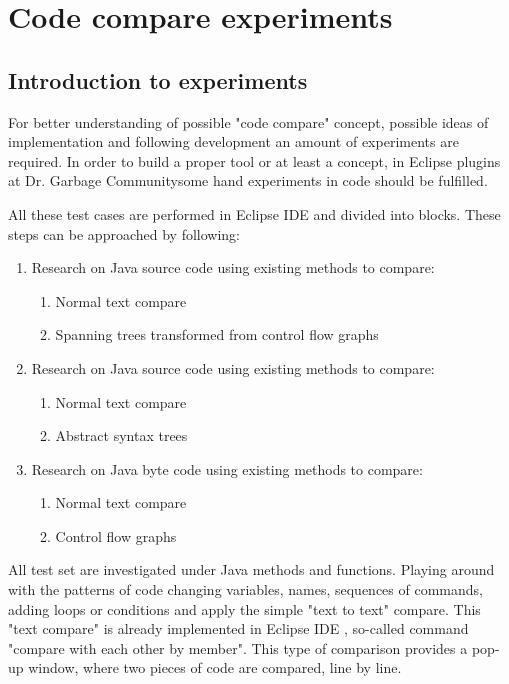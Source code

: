 \documentclass{report}
\begin{document}

\chapter{Code compare experiments}
\label{cha:experimental}
\section{Introduction to experiments}

For better understanding of possible "code compare" concept, possible ideas of implementation and following development an amount of experiments are required.
In order to build a proper tool or at least a concept, in Eclipse plugins at Dr. Garbage Community\textregistered \enspace some hand experiments in code should be fulfilled.

All these test cases are performed in Eclipse IDE \cite{eclipse_site} and divided into blocks. These steps can be approached by following:

\begin{enumerate}
  \item Research on Java source code using existing methods to compare:
  	\begin{enumerate}
   	 	\item Normal text compare
   		 \item Spanning trees transformed from control flow graphs
	 \end{enumerate}	
	 
  \item Research on Java source code using existing methods to compare:
  \begin{enumerate}
    \item Normal text compare 
    \item Abstract syntax trees
  \end{enumerate}
  
  \item Research on Java byte code using existing methods to compare:
  \begin{enumerate}
    \item Normal text compare 
    \item Control flow graphs
  \end{enumerate}
\end{enumerate}

All test set are investigated under Java methods and functions. Playing around with the patterns of code changing variables, names, sequences of commands, adding loops or conditions and apply the simple "text to text" compare. This "text compare" is already implemented in Eclipse IDE \cite{eclipse_site}, so-called command "compare with each other by member". This type of comparison provides a pop-up window, where two pieces of code are compared, line by line.
\end{document}
